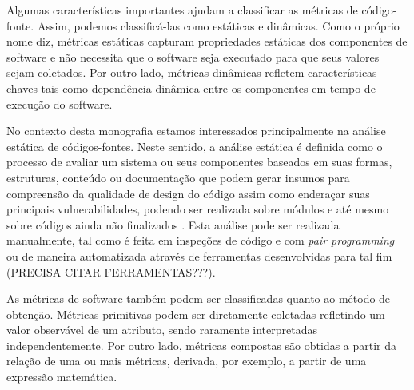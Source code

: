 %

Algumas características importantes ajudam a classificar as métricas de código-fonte. Assim, podemos classificá-las como estáticas e dinâmicas. Como o próprio nome diz, métricas estáticas capturam propriedades estáticas dos componentes de software e não necessita que o software seja executado para que seus valores sejam coletados. Por outro lado, métricas dinâmicas refletem características chaves tais como dependência dinâmica entre os componentes em tempo de execução do software.

%

No contexto desta monografia estamos interessados principalmente na análise estática de códigos-fontes. Neste sentido, a análise estática é definida como o processo de avaliar um sistema ou seus componentes baseados em suas formas, estruturas, conteúdo ou documentação que podem gerar insumos para compreensão da qualidade de design do código assim como enderaçar suas principais vulnerabilidades, podendo ser realizada sobre módulos e até mesmo sobre códigos ainda não finalizados \cite{black2009}. Esta análise pode ser realizada manualmente, tal como é feita em inspeções de código e com \emph{pair programming} ou de maneira automatizada através de ferramentas desenvolvidas para tal fim (PRECISA CITAR FERRAMENTAS???). 

%

As métricas de software também podem ser classificadas quanto ao método de obtenção. Métricas primitivas podem ser diretamente coletadas refletindo um valor observável de um atributo, sendo raramente interpretadas independentemente. Por outro lado, métricas compostas são obtidas a partir da relação de uma ou mais métricas, derivada, por exemplo, a partir de uma expressão matemática.

%

